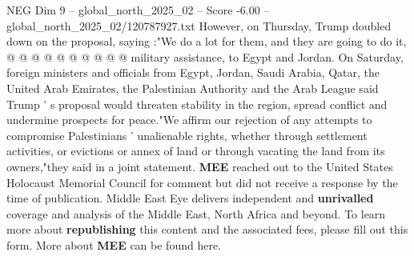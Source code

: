 \begin{textsample}{NEG Dim 9 – global\_north\_2025\_02 – Score -6.00 – global\_north\_2025\_02/120787927.txt}
However, on Thursday, Trump doubled down on the proposal, saying :"We do a lot for them, and they are going to do it, @ @ @ @ @ @ @ @ @ @ military assistance, to Egypt and Jordan.
On Saturday, foreign ministers and officials from Egypt, Jordan, Saudi Arabia, Qatar, the United Arab Emirates, the Palestinian Authority and the Arab League said Trump ' s proposal would threaten stability in the region, spread conflict and undermine prospects for peace."We affirm our rejection of any attempts to compromise Palestinians ' unalienable rights, whether through settlement activities, or evictions or annex of land or through vacating the land from its owners,"they said in a joint statement. \textbf{MEE} reached out to the United States Holocaust Memorial Council for comment but did not receive a response by the time of publication.
Middle East Eye delivers independent and \textbf{unrivalled} coverage and analysis of the Middle East, North Africa and beyond.
To learn more about \textbf{republishing} this content and the associated fees, please fill out this form.
More about \textbf{MEE} can be found here.

\end{textsample}
